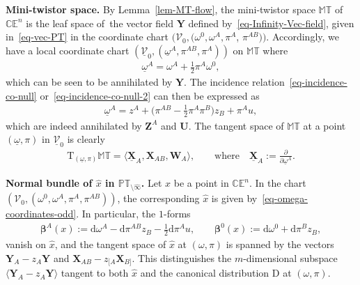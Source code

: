 \documentclass[pdftex]{sigma}
\numberwithin{equation}{section}
\newcommand{\parderv}[2] {\frac{\partial#1}{\partial#2}}
\newcommand{\mc} [1]{\mathcal{#1}}
\newcommand{\Drm} {{\mathrm{D}}}
\newcommand{\dd} {\mathrm{d}}
\newcommand{\Tgt} {\mathrm{T}}
\newcommand{\PT} {\mathbb{PT}}
\newcommand{\T} {\mathbb{T}}
\newcommand{\E} {\mathbb{E}}
\newcommand{\M} {\mathbb{M}}
\newcommand{\C} {\mathbb{C}}
\begin{document}
{\bf Mini-twistor space.} By Lemma~\ref{lem-MT-flow}, the mini-twistor space $\M\T$ of $\C \E^n$ is the leaf space of~the vector f\/ield $\bm{Y}$ def\/ined by~\eqref{eq-Infinity-Vec-field}, given in~\eqref{eq-vec-PT} in the coordinate chart $(\mc{V}_0, (\omega^0, \omega^A, \pi^A$, $\pi^{AB}))$. Accordingly, we have a local coordinate chart $(\underline{\mc{V}}_0, ( \underline{\omega}^{A} , \pi^{AB} , \pi^{A} ))$ on $\M\T$ where
\begin{gather*}
\underline{\omega}^{A} = \omega^{A}+ \tfrac{1}{2} \pi^{A} \omega^0 ,
\end{gather*}
which can be seen to be annihilated by $\bm{Y}$. The incidence relation~\eqref{eq-incidence-co-null} or~\eqref{eq-incidence-co-null-2} can then be expressed as
\begin{gather*}
\underline{\omega}^{A} = z^{A} + \big( \pi^{AB} - \tfrac{1}{2} \pi^{A} \pi^{B} \big) z_{B}+ \pi^{A} u ,
\end{gather*}
which are indeed annihilated by $\bm{Z}^A$ and $\bm{U}$. The tangent space of $\M\T$ at a point $(\underline{\omega},\pi)$ in $\underline{\mc{V}}_0$ is clearly
\begin{gather*}
\Tgt_{(\underline{\omega},\pi)} \M\T = \langle \underline{\bm{X}}_A , \bm{X}_{AB} , \bm{W}_A \rangle , \qquad \text{where} \quad \underline{\bm{X}}_A := \parderv{}{\underline{\omega}^A} .
\end{gather*}

{\bf Normal bundle of $\hat{x}$ in $\PT_{\setminus \widehat{\infty}}$.} Let $x$ be a point in $\C \E^n$. In the chart $(\mc{V}_0, (\omega^0, \omega^A, \pi^A, \pi^{AB}))$, the corresponding $\hat{x}$ is given by~\eqref{eq-omega-coordinates-odd}. In particular, the $1$-forms
\begin{gather*}
\bm{\beta}^A (x) := \dd \omega^A - \dd \pi^{AB} z_B - \tfrac{1}{2} \dd \pi^A u , \qquad \bm{\beta}^0 (x) := \dd \omega^0 + \dd \pi^B z_B ,
\end{gather*}
vanish on $\hat{x}$, and the tangent space of $\hat{x}$ at $(\omega,\pi)$ is spanned by the vectors $\bm{Y}_A - z_A \bm{Y}$ and $\bm{X}_{AB} - z_{[A} \bm{X}_{B]}$. This distinguishes the $m$-dimensional subspace $\langle \bm{Y}_A - z_A \bm{Y}\rangle$ tangent to both $\hat{x}$ and the canonical distribution $\Drm$ at $(\omega,\pi)$.
\end{document}
